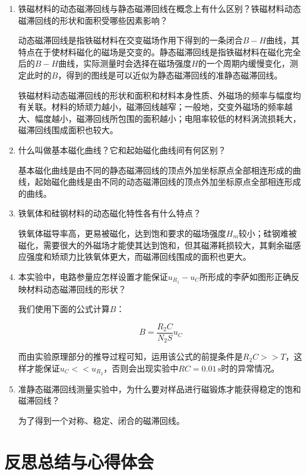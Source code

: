 \documentclass[12pt]{article}
\begin{document}
\begin{enumerate}
    \item {\kaishu 铁磁材料的动态磁滞回线与静态磁滞回线在概念上有什么区别？铁磁材料动态磁滞回线的形状和面积受哪些因素影响？}
    
    动态磁滞回线是指铁磁材料在交变磁场作用下得到的一条闭合$ B-H $曲线，其特点在于使材料磁化的磁场是交变的。静态磁滞回线是指铁磁材料在磁化完全后的$ B-H $曲线，实际测量时会选择在磁场强度$ H $的一个周期内缓慢变化，测定此时的$ B $，得到的图线是可以近似为静态磁滞回线的准静态磁滞回线。

    铁磁材料动态磁滞回线的形状和面积和材料本身性质、外磁场的频率与幅度均有关联。材料的矫顽力越小，磁滞回线越窄；一般地，交变外磁场的频率越大、幅度越小，磁滞回线所包围的面积越小；电阻率较低的材料涡流损耗大，磁滞回线围成面积也较大。

    \item {\kaishu 什么叫做基本磁化曲线？它和起始磁化曲线间有何区别？}
    
    基本磁化曲线是由不同的静态磁滞回线的顶点外加坐标原点全部相连形成的曲线，起始磁化曲线是由不同的动态磁滞回线的顶点外加坐标原点全部相连形成的曲线。

    \item {\kaishu 铁氧体和硅钢材料的动态磁化特性各有什么特点？}
    
    铁氧体磁导率高，更易被磁化，达到饱和要求的磁场强度$H_m$较小；硅钢难被磁化，需要很大的外磁场才能使其达到饱和，但其磁滞耗损较大，其剩余磁感应强度和矫顽力比铁氧体更大，而磁滞回线围成的面积也更大。

    \item {\kaishu 本实验中，电路参量应怎样设置才能保证$ u_{R_1}-u_C $所形成的李萨如图形正确反映材料动态磁滞回线的形状？}
    
    我们使用下面的公式计算$B$：
    
    \[
        B=\frac{R_2C}{N_2S}u_C
    \]

    而由实验原理部分的推导过程可知，运用该公式的前提条件是$R_2C>>T$，这样才能保证$u_C<<u_{R_2}$，否则会出现实验中$RC=0.01\,\mathrm{s}$时的异常情况。

    \item {\kaishu 准静态磁滞回线测量实验中，为什么要对样品进行磁锻炼才能获得稳定的饱和磁滞回线？}
    
    为了得到一个对称、稳定、闭合的磁滞回线。
\end{enumerate}

\section{反思总结与心得体会}
\end{document}
